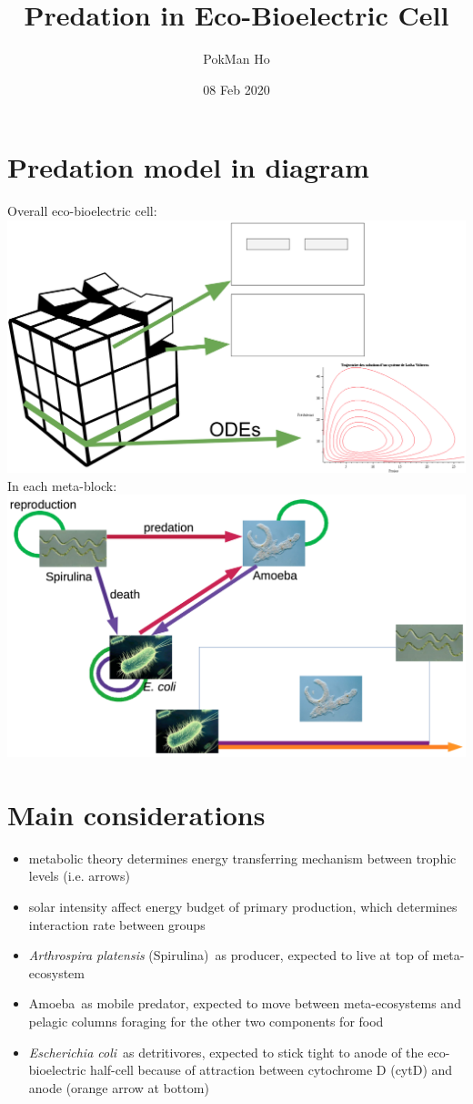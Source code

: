 \documentclass[a4paper,11pt]{article}
\title{Predation in Eco-Bioelectric Cell}
\author{PokMan Ho}
\date{08 Feb 2020}
\newcommand{\ec}{\textit{Escherichia coli}}
\newcommand{\am}{Amoeba}
\newcommand{\ap}{\textit{Arthrospira platensis} (Spirulina)}
\begin{document}
    \maketitle
    \tableofcontents

    \section{Predation model in diagram}
    Overall eco-bioelectric cell:\\
    \includegraphics[width=\linewidth]{sandbox/graph/modelOverview.png}
    In each meta-block:\\
    \includegraphics[width=\linewidth]{sandbox/graph/model.png}
    
    \section{Main considerations}
    \begin{itemize}
        \item metabolic theory determines energy transferring mechanism between trophic levels (i.e. arrows)
        \item solar intensity affect energy budget of primary production, which determines interaction rate between groups
        \item \ap\ as producer, expected to live at top of meta-ecosystem
        \item \am\ as mobile predator, expected to move between meta-ecosystems and pelagic columns foraging for the other two components for food
        \item \ec\ as detritivores, expected to stick tight to anode of the eco-bioelectric half-cell because of attraction between cytochrome D (cytD) and anode (orange arrow at bottom)
    \end{itemize}
    
\end{document}
